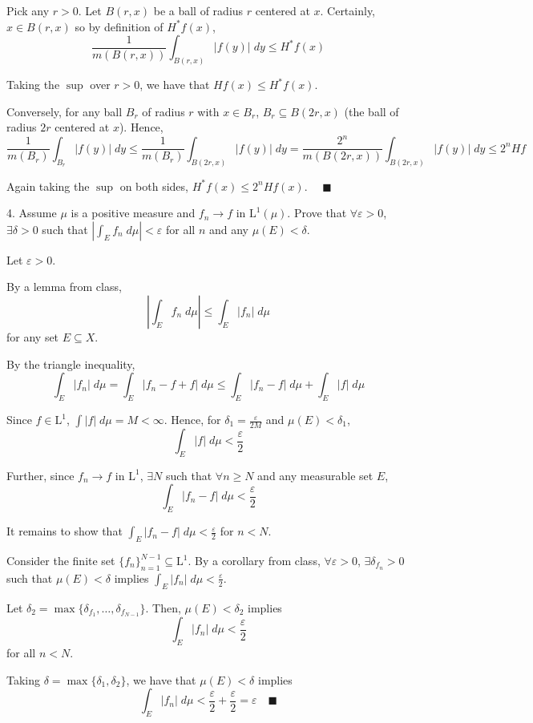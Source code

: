 \documentclass[12pt]{article}
\newcommand{\qed}{\quad \blacksquare}
\newcommand{\abs}[1]{\left\vert #1 \right\vert}
\newcommand{\ep}{\varepsilon}
\renewcommand{\L}{\text{L}}
\newcommand{\sub}{\subseteq}
\begin{document}
        Pick any $r > 0$. Let $B(r, x)$ be a ball of radius $r$ centered at $x$. Certainly, $x \in B(r, x)$ so by definition of $H^* f(x)$,
        \[\frac{1}{m(B(r, x))} \int_{B(r, x)} \abs{f(y)}\; dy \leq H^* f(x)\]

        Taking the $\sup$ over $r > 0$, we have that $H f(x) \leq H^* f(x)$.

        Conversely, for any ball $B_r$ of radius $r$ with $x \in B_r$, $B_r \sub B(2r, x)$ (the ball of radius $2r$ centered at $x$). Hence,
        \[\frac{1}{m(B_r)} \int_{B_r} \abs{f(y)}\; dy \leq \frac{1}{m(B_r)} \int_{B(2r, x)} \abs{f(y)}\; dy = \frac{2^n}{m(B(2r, x))} \int_{B(2r, x)} \abs{f(y)}\; dy \leq 2^n H f\]

        Again taking the $\sup$ on both sides, $H^* f(x) \leq 2^n H f(x)$. $\qed$
    \color{black}


\pagebreak

4. Assume $\mu$ is a positive measure and $f_n \to f$ in $\L^1(\mu)$. Prove that $\forall \ep > 0$, $\exists \delta  >0$ such that $\abs{\int_E f_n \; d\mu} < \ep$ for all $n$ and any $\mu(E) < \delta$. 

    \color{blue}
        Let $\ep > 0$. 
        
        By a lemma from class, 
        \[\abs{\int_E f_n \; d\mu} \leq \int_E \abs{f_n} \; d\mu\]
        for any set $E \sub X$. 

        By the triangle inequality,
        \[\int_E \abs{f_n} \; d\mu = \int_E \abs{f_n - f + f} \; d\mu \leq \int_E \abs{f_n - f} \; d\mu + \int_E \abs{f} \; d\mu\]

        Since $f \in \L^1$, $\int \abs{f} \; d\mu = M < \infty$. Hence, for $\delta_1 = \frac{\ep}{2M}$ and $\mu(E) < \delta_1$, 
        \[\int_E \abs{f} \; d\mu < \frac{\ep}{2} \]
    
        Further, since $f_n \to f$ in $\L^1$, $\exists N$ such that $\forall n \geq N$ and any measurable set $E$,
        \[\int_E \abs{f_n - f} \; d\mu < \frac{\ep}{2}\] 

        It remains to show that $\int_E \abs{f_n - f} \; d\mu < \frac{\ep}{2}$ for $n < N$.     

        Consider the finite set $\{f_n\}_{n=1}^{N-1} \sub \L^1$. By a corollary from class, $\forall \ep > 0$, $\exists \delta_{f_n} > 0$ such that $\mu(E) < \delta$ implies $\int_E \abs{f_n} \; d\mu < \frac{\ep}{2}$. 
        
        Let $\delta_2 = \max\{\delta_{f_1}, \ldots, \delta_{f_{N-1}}\}$. Then, $\mu(E) < \delta_2$ implies
        \[\int_E \abs{f_n} \; d\mu < \frac{\ep}{2}\]
        for all $n < N$.

        Taking $\delta = \max\{\delta_1, \delta_2\}$, we have that $\mu(E) < \delta$ implies
        \[\int_E \abs{f_n} \; d\mu < \frac{\ep}{2} + \frac{\ep}{2} = \ep \qed\]
        
    \color{black}
\end{document}
